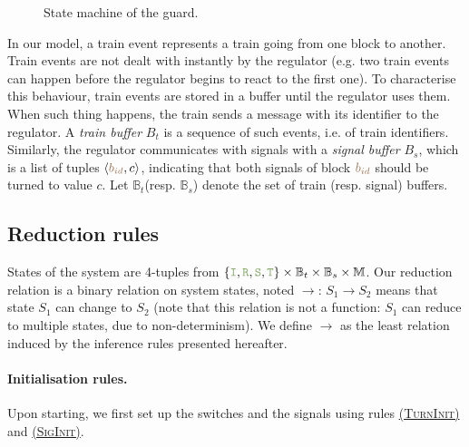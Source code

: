 \documentclass[runningheads]{llncs}
\newcommand{\ruleFmt}[1]{\textsc{(#1)}}
\newcommand{\ruleRef}[1]{\hyperlink{#1}{\ruleFmt{#1}}}
\newcommand{\tuple}[1]{\ensuremath{\langle #1\rangle}}
\newcommand{\modelSet}{\ensuremath{\mathbb{M}}}
\newcommand{\posFmt}[1]{{\color{poscolor}{#1}}}
\newcommand{\bid}[1]{\ensuremath{\posFmt{b_{#1}}}}
\newcommand{\guardFmt}[1]{{\color{guardcolor} \ensuremath{\mathtt{#1}}}}
\newcommand{\guardT}{\guardFmt{T}}
\newcommand{\guardS}{\guardFmt{S}}
\newcommand{\guardR}{\guardFmt{R}}
\newcommand{\guardI}{\guardFmt{I}}
\newcommand{\bufferFmt}[1]{#1}
\newcommand{\bufTrainSet}{\ensuremath{\bufferFmt{\mathbb{B}_t}}\xspace}
\newcommand{\bufSigSet}{\ensuremath{\bufferFmt{\mathbb{B}_s}}\xspace}
\newcommand{\bufTrain}{\ensuremath{\bufferFmt{B_t}}\xspace}
\newcommand{\bufSig}{\ensuremath{\bufferFmt{B_s}}\xspace}
\newcommand{\reduces}{\ensuremath{\rightarrow}}
\begin{document}
\begin{figure}
	\centering
	\caption{State machine of the guard.}
	\label{fig:state_machine_guard}
\end{figure}

In our model, a train event represents a train going from one block to another. Train events are not dealt with instantly by the regulator (e.g. two train events can happen before the regulator begins to react to the first one). To characterise this behaviour, train events are stored in a buffer until the regulator uses them. When such thing happens, the train sends a message with its identifier to the regulator. A \emph{train buffer} \bufTrain is a sequence of such events, i.e. of train identifiers.
Similarly, the regulator communicates with signals with a \emph{signal buffer} \bufSig, which is a list of tuples $\tuple{\bid{id}, c}$, indicating that both signals of block $\bid{id}$ should be turned to value $c$. Let \bufTrainSet (resp. \bufSigSet) denote the set of train (resp. signal) buffers.

\subsection{Reduction rules}

States of the system are 4-tuples from $\{\guardI, \guardR, \guardS, \guardT\} \times \bufTrainSet \times \bufSigSet \times \modelSet$. Our reduction relation is a binary relation on system states, noted $\reduces$: $S_1 \reduces S_2$ means that state $S_1$ can change to $S_2$ (note that this relation is not a function: $S_1$ can reduce to multiple states, due to non-determinism). We define $\reduces$ as the least relation induced by the inference rules presented hereafter.

\paragraph{Initialisation rules.}
Upon starting, we first set up the switches and the signals using rules \ruleRef{TurnInit} and \ruleRef{SigInit}.
\end{document}
